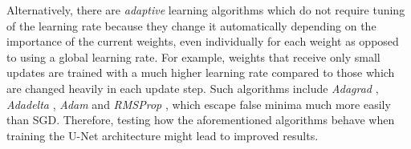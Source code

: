 Alternatively, there are \textit{adaptive} learning algorithms which do not require tuning of the learning rate because they change it automatically depending on the importance of the current weights, even individually for each weight as opposed to using a global learning rate. For example, weights that receive only small updates are trained with a much higher learning rate compared to those which are changed heavily in each update step. Such algorithms include \textit{Adagrad} \cite{adagrad}, \textit{Adadelta} \cite{adadelta}, \textit{Adam} \cite{adam} and \textit{RMSProp} \cite{rmsprop}, which escape false minima much more easily than SGD. Therefore, testing how the aforementioned algorithms behave when training the U-Net architecture might lead to improved results.